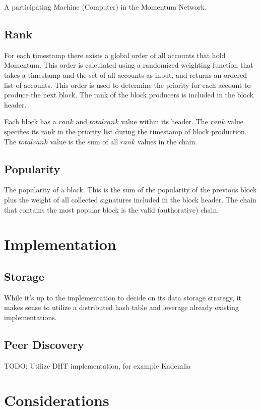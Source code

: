 \documentclass[conference]{IEEEtran}
\begin{document}
A participating Machine (Computer) in the Momentum Network. 

\subsection{Rank}

For each timestamp there exists a global order of all accounts that hold Momentum. This order is calculated using a randomized
weighting function that takes a timestamp and the set of all accounts as input, and returns an ordered list of accounts.
This order is used to determine the priority for each account to produce the next block. The rank of the block producers is included
in the block header.

Each block has a $rank$ and $total rank$ value within its header. The $rank$ value specifies its rank in the priority list during the timestamp of block production.
The $total rank$ value is the sum of all $rank$ values in the chain.


\subsection{Popularity}

The popularity of a block. This is the sum of the popularity of the previous block plus the weight of all collected signatures included in the block header.
The chain that contains the most popular block is the valid (authorative) chain.


\section{Implementation}


\subsection{Storage}
While it's up to the implementation to decide on its data storage strategy, it makes sense to utilize a distributed hash table and leverage already existing implementations.

\subsection{Peer Discovery}
TODO: Utilize DHT implementation, for example Kademlia

\section{Considerations}
\end{document}
